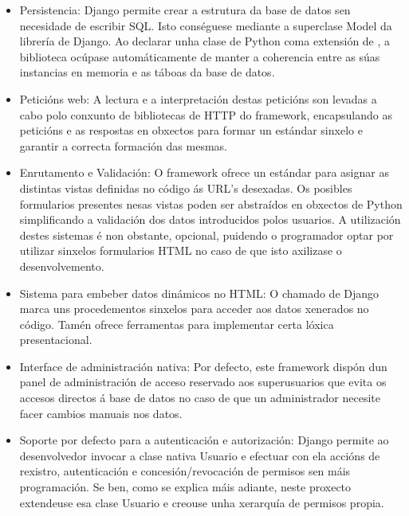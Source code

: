 \begin{itemize}
	
	\item Persistencia: Django permite crear a estrutura da base de datos sen necesidade de escribir SQL. Isto 
	conséguese mediante a superclase Model da librería  de Django. Ao declarar unha clase de Python coma
	extensión de , a biblioteca ocúpase automáticamente de manter a coherencia entre as súas instancias en 
	memoria e as táboas da base de datos. 
	
	\item Peticións web: A lectura e a interpretación destas peticións son levadas a cabo polo conxunto de bibliotecas
	de HTTP do framework, encapsulando as peticións e as respostas en obxectos para formar un estándar sinxelo e garantir
	a correcta formación das mesmas.
	
	\item Enrutamento e Validación: O framework ofrece un estándar para asignar as distintas vistas definidas no código
	ás URL's desexadas. Os posibles formularios presentes nesas vistas poden ser abstraídos en obxectos de Python 
	simplificando a validación dos datos introducidos polos usuarios. A utilización destes sistemas é non obstante, 
	opcional, puidendo o programador optar por utilizar sinxelos formularios HTML no caso de que isto axilizase 
	o desenvolvemento.
	
	\item Sistema para embeber datos dinámicos no HTML: O chamado  de Django marca uns procedementos
	sinxelos para acceder aos datos xenerados no código. Tamén ofrece ferramentas para implementar certa lóxica
	presentacional.
	
	\item Interface de administración nativa: Por defecto, este framework dispón dun panel de administración de acceso
	reservado aos superusuarios que evita os accesos directos á base de datos no caso de que un administrador necesite
	facer cambios manuais nos datos.
	
	\item Soporte por defecto para a autenticación e autorización: Django permite ao desenvolvedor invocar a clase 
	nativa Usuario e efectuar con ela accións de rexistro, autenticación e concesión/revocación de permisos sen máis
	programación. Se ben, como se explica máis adiante, neste proxecto extendeuse esa clase Usuario e creouse unha
	xerarquía de permisos propia.

\end{itemize}   


